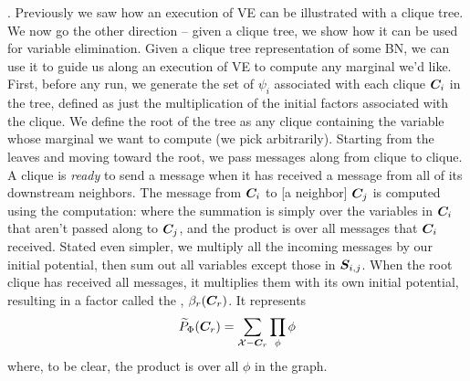\documentclass[11pt]{article}
\begin{document}
\myspace
\p {}. Previously we saw how an execution of VE can be illustrated with a clique tree. We now go the other direction -- given a clique tree, we show how it can be used for variable elimination. Given a clique tree representation of some BN, we can use it to guide us along an execution of VE to compute any marginal we'd like. First, before any run, we generate the set of  $\psi_i$ associated with each clique $\matr[i]{C}$ in the tree, defined as just the multiplication of the initial factors associated with the clique. We define the root of the tree as any clique containing the variable whose marginal we want to compute (we pick arbitrarily). Starting from the leaves and moving toward the root, we pass messages along from clique to clique. A clique is \textit{ready} to send a message when it has received a message from all of its downstream neighbors. The message from $\matr[i]{C}$ to [a neighbor] $\matr[j]{C}$ is computed using the  computation:
where the summation is simply over the variables in $\matr[i]{C}$ that aren't passed along to $\matr[j]{C}$, and the product is over all messages that $\matr[i]{C}$ received. Stated even simpler, we multiply all the incoming messages by our initial potential, then sum out all variables except those in $\matr[i,j]{S}$. When the root clique has received all messages, it multiplies them with its own initial potential, resulting in a factor called the , $\beta_r(\matr[r]{C})$. It represents
\begin{align}
	\widetilde{P}_{\Phi}(\matr[r]{C}) = \sum_{\mathcal X - \matr[r]{C}} \prod_{\phi} \phi
\end{align}
where, to be clear, the product is over all $\phi$ in the graph. \\
\end{document}
